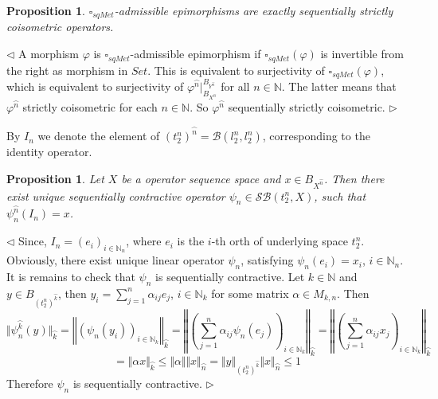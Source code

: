 \documentclass[12pt]{article}
\newtheorem{proposition}[theorem]{Proposition}
\newenvironment{proof}{\par $\triangleleft$}{$\triangleright$}
\begin{document}
\begin{proposition}\label{PrDecsMetrAdmEpiMorph}
$\square_{sqMet}$-admissible epimorphisms are exactly sequentially strictly coisometric operators.
\end{proposition}
\begin{proof}
A morphism $\varphi$ is $\square_{sqMet}$-admissible epimorphism if $\square_{sqMet}(\varphi)$ is invertible from the right as morphism in $Set$. This is equivalent to surjectivity of $\square_{sqMet}(\varphi)$, which is equivalent to surjectivity of $\varphi^{\wideparen{n}}|_{B_{X^{\wideparen{n}}}}^{B_{Y^{\wideparen{n}}}}$ for all $n\in\mathbb{N}$. The latter means that $\varphi^{\wideparen{n}}$ strictly coisometric for each $n\in\mathbb{N}$. So $\varphi^{\wideparen{n}}$ sequentially strictly coisometric.
\end{proof}


By $I_n$ we denote the element of $(t_2^n)^{\wideparen{n}} = \mathcal{B}(l_2^n, l_2^n)$, corresponding to the identity operator.

\begin{proposition}\label{PrMetrFrLem} Let $X$ be a operator sequence space and $x \in B_{X^{\wideparen{n}}}$. Then there exist unique sequentially contractive operator 
$\psi_n \in \mathcal{SB}(t_2^n, X)$, such that $\psi_n^{\wideparen{n}}(I_n) = x$.
\end{proposition}
\begin{proof}
Since, $I_n = (e_i)_{i\in\mathbb{N}_n}$, where $e_i$ is the $i$-th orth of underlying space $t_2^n$. Obviously, there exist unique linear operator $\psi_n$, satisfying $\psi_n(e_i) = x_i$, $i\in\mathbb{N}_n$. 
It is remains to check that $\psi_n$ is sequentially contractive. Let $k \in \mathbb{N}$ and $y \in B_{(t_2^n)^{\wideparen{k}}} $, then $y_i = \sum_{j = 1}^n \alpha_{ij}e_j$, $i\in\mathbb{N}_k$ 
for some matrix $\alpha\in M_{k,n}$. Then
$$
\Vert\psi_n^{\wideparen{k}}(y)\Vert_{\wideparen{k}}
=\left\Vert\left(\psi_n(y_i)\right)_{i\in\mathbb{N}_k}\right\Vert_{\wideparen{k}}
=\left\Vert\left(\sum\limits_{j=1}^n\alpha_{ij}\psi_n(e_j)\right)_{i\in\mathbb{N}_k}\right\Vert_{\wideparen{k}}
=\left\Vert\left(\sum\limits_{j=1}^n\alpha_{ij}x_j\right)_{i\in\mathbb{N}_k}\right\Vert_{\wideparen{k}}
$$
$$
=\Vert\alpha x\Vert_{\wideparen{k}}
\leq\Vert\alpha\Vert\Vert x\Vert_{\wideparen{n}}
=\Vert y\Vert_{(t_2^n)^{\wideparen{k}}}\Vert x\Vert_{\wideparen{n}}\leq 1
$$
Therefore $\psi_n$ is sequentially contractive.
\end{proof}
\end{document}
